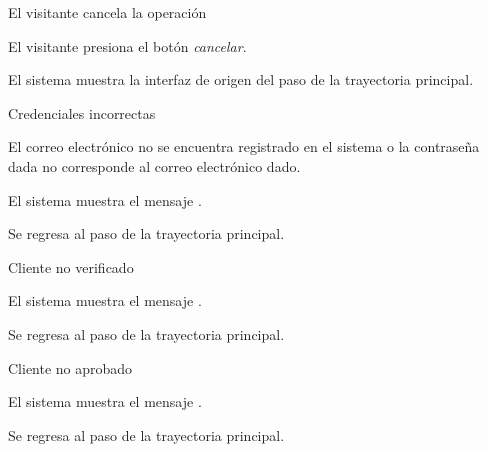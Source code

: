 {  \begin{trayectoriaAlternativa}[ta:cancelar]
    {El visitante cancela la operación}

    \item El visitante presiona el botón \textit{cancelar}.

    \item El sistema muestra la interfaz de origen del paso
       de la trayectoria principal.

  \end{trayectoriaAlternativa}

  \begin{trayectoriaAlternativa}
    {Credenciales incorrectas}

    \item El correo electrónico no se encuentra registrado en el sistema o la
      contraseña dada no corresponde al correo electrónico dado.

    \item El sistema muestra el mensaje
      .

    \item Se regresa al paso  de la trayectoria
      principal.

  \end{trayectoriaAlternativa}

  \begin{trayectoriaAlternativa}
    {Cliente no verificado}

    \item El sistema muestra el mensaje
      .

    \item Se regresa al paso  de la trayectoria
      principal.

  \end{trayectoriaAlternativa}

  \begin{trayectoriaAlternativa}
    {Cliente no aprobado}

    \item El sistema muestra el mensaje
      .

    \item Se regresa al paso  de la trayectoria
      principal.

  \end{trayectoriaAlternativa}

}
